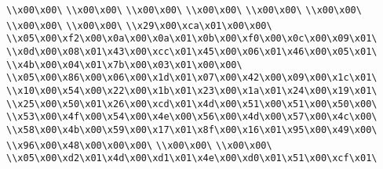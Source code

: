 \verb|\\x00\x00\|\newline
\verb|\\x00\x00\|\newline
\verb|\\x00\x00\|\newline
\verb|\\x00\x00\|\newline
\verb|\\x00\x00\|\newline
\verb|\\x00\x00\|\newline
\verb|\\x00\x00\|\newline
\verb|\\x00\x00\|\newline
\verb|\\x29\x00\xca\x01\x00\x00\|\newline
\verb|\\x05\x00\xf2\x00\x0a\x00\x0a\x01\x0b\x00\xf0\x00\x0c\x00\x09\x01\|\newline
\verb|\\x0d\x00\x08\x01\x43\x00\xcc\x01\x45\x00\x06\x01\x46\x00\x05\x01\|\newline
\verb|\\x4b\x00\x04\x01\x7b\x00\x03\x01\x00\x00\|\newline
\verb|\\x05\x00\x86\x00\x06\x00\x1d\x01\x07\x00\x42\x00\x09\x00\x1c\x01\|\newline
\verb|\\x10\x00\x54\x00\x22\x00\x1b\x01\x23\x00\x1a\x01\x24\x00\x19\x01\|\newline
\verb|\\x25\x00\x50\x01\x26\x00\xcd\x01\x4d\x00\x51\x00\x51\x00\x50\x00\|\newline
\verb|\\x53\x00\x4f\x00\x54\x00\x4e\x00\x56\x00\x4d\x00\x57\x00\x4c\x00\|\newline
\verb|\\x58\x00\x4b\x00\x59\x00\x17\x01\x8f\x00\x16\x01\x95\x00\x49\x00\|\newline
\verb|\\x96\x00\x48\x00\x00\x00\|\newline
\verb|\\x00\x00\|\newline
\verb|\\x00\x00\|\newline
\verb|\\x05\x00\xd2\x01\x4d\x00\xd1\x01\x4e\x00\xd0\x01\x51\x00\xcf\x01\|\newline
